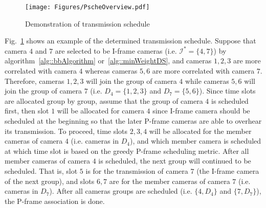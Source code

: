 \begin{figure}
\begin{center}
\texttt{[image: Figures/PscheOverview.pdf]}
\caption{\label{fig::pScheOverview}Demonstration of transmission schedule}
\end{center}
\end{figure}
%
Fig.~\ref{fig::pScheOverview} shows an example of the determined transmission schedule.
Suppose that camera $4$ and $7$ are selected to be I-frame cameras (i.e.  ${\mathcal{I}^*=\{4,7\}}$) by algorithm~\ref{alg::bbAlgorithm} or~\ref{alg::minWeightDS}, and cameras $1,2,3$ are more correlated with camera $4$ whereas cameras $5,6$ are more correlated with camera $7$.
Therefore, cameras $1,2,3$ will join the group of camera $4$ while cameras $5,6$ will join the group of camera $7$ (i.e. ${D_4=\{1,2,3\}}$ and ${D_7=\{5,6\}}$).
Since time slots are allocated group by group, assume that the group of camera $4$ is scheduled first, then slot $1$ will be allocated for camera $4$ since I-frame camera should be scheduled at the beginning so that the later P-frame cameras are able to overhear its transmission.
To proceed, time slots $2,3,4$ will be allocated for the member cameras of camera $4$ (i.e. cameras in $D_4$), and which member camera is scheduled at which time slot is based on the greedy P-frame scheduling metric.
After all member cameras of camera $4$ is scheduled, the next group will continued to be scheduled.
That is, slot $5$ is for the transmission of camera $7$ (the I-frame camera of the next group), and slots $6,7$ are for the member cameras of camera $7$ (i.e. cameras in $D_7$).
After all cameras groups are scheduled (i.e. ${\{4,D_4\}}$ and ${\{7,D_7\}}$), the P-frame association is done.